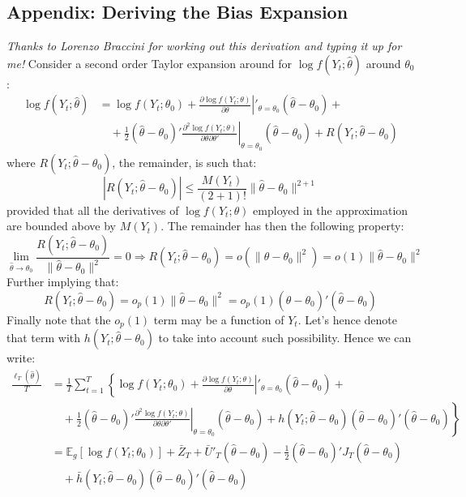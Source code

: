 \subsection{Appendix: Deriving the Bias Expansion}
\label{sec:BiasExpansion}
\emph{Thanks to Lorenzo Braccini for working out this derivation and typing it up for me!}
Consider a second order Taylor expansion around for $\log f(Y_t;\hat{\theta})$ around $\theta_0$:
\begin{align*}
\log f(Y_t;\hat{\theta}) &= \log f(Y_t;\theta_0)+\left.\frac{\partial\log f(Y_t;\theta)}{\partial\theta}\right|'_{\theta=\theta_0} (\widehat{\theta}-\theta_0) +  \\ 
& \quad + \frac{1}{2}(\widehat{\theta}-\theta_0)' \left.\frac{\partial^2\log f(Y_t;\theta)}{\partial\theta\partial\theta'}\right|_{\theta=\theta_0} (\widehat{\theta}-\theta_0) +R(Y_t;\hat{\theta}-\theta_0)
\end{align*}
where $R(Y_t;\hat{\theta}-\theta_0)$, the remainder, is such that:
\[
\left|R(Y_t;\widehat{\theta}-\theta_0)\right|\leq \frac{M(Y_t)}{(2+1)!}\| \widehat{\theta}-\theta_0 \|^{2+1}
\]
provided that all the derivatives of $\log f(Y_t;\theta)$ employed in the approximation are bounded above by $M(Y_t)$. The remainder has then the following property:
\[
\lim_{\widehat{\theta} \rightarrow \theta_0} \frac{R(Y_t;\widehat{\theta}-\theta_0)}{\| \widehat{\theta}-\theta_0 \|^{2}}=0\Rightarrow R(Y_t;\widehat{\theta}-\theta_0)=o(\| \widehat{\theta}-\theta_0 \|^{2})=o(1)\| \widehat{\theta}-\theta_0 \|^{2}
\]
Further implying that:
\[
R(Y_t;\hat{\theta}-\theta_0)=o_p(1)\| \hat{\theta}-\theta_0 \|^{2}=o_p(1)(\widehat{\theta}-\theta_0)'(\widehat{\theta}-\theta_0)
\]
Finally note that the $o_p(1)$ term may be a function of $Y_t$. Let's hence denote that term with $h(Y_t;\hat{\theta}-\theta_0)$ to take into account such possibility. Hence we can write:
\begin{align*}
\frac{\ell_{T}(\widehat{\theta})}{T}&= \frac{1}{T}\sum_{t=1}^{T}\left\{\log f(Y_t;\theta_0)+\left.\frac{\partial\log f(Y_t;\theta)}{\partial\theta}\right|'_{\theta=\theta_0}(\widehat{\theta}-\theta_0) + \right. \\ & \left. \quad +\frac{1}{2}(\widehat{\theta}-\theta_0)' \left.\frac{\partial^2\log f(Y_t;\theta)}{\partial\theta\partial\theta'}\right|_{\theta=\theta_0} (\widehat{\theta}-\theta_0) +h(Y_t;\hat{\theta}-\theta_0)(\widehat{\theta}-\theta_0)'(\widehat{\theta}-\theta_0) \right\}\\
& = \mathbb{E}_g \left[\log f(Y_t;\theta_0) \right]+\bar{Z}_T+\bar{U}'_T  (\widehat{\theta}-\theta_0)  - \frac{1}{2} (\widehat{\theta}-\theta_0)'  J_T  (\widehat{\theta}-\theta_0) \\
&\quad + \bar{h}(Y_t;\hat{\theta}-\theta_0)(\widehat{\theta}-\theta_0)'(\widehat{\theta}-\theta_0)
\end{align*}

